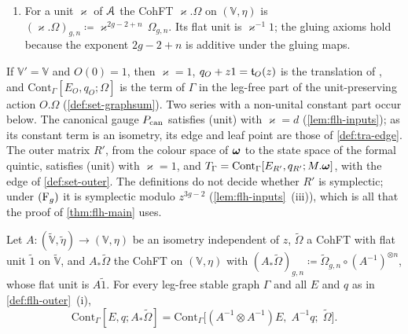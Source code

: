 \begin{defn}
\begin{enumerate}
\[
\text{(unit)}\qquad O_0^{-1}1'=\varkappa^{-1}1\quad\text{for a unit }\varkappa\text{ of }\cA .
\]
The edge and the leaf point of $O$ are
\[
E_O(\psi,\psi')\coloneqq\frac{\eta^{-1}-\bigl(O^{-1}(\psi)\otimes O^{-1}(\psi')\bigr)\eta'^{-1}}{\psi+\psi'},\qquad q_O(z)\coloneqq O^{-1}(z)(-z1'),
\]
where $\eta^{-1}\in\mathbb V\otimes\mathbb V$ and $\eta'^{-1}\in\mathbb V'\otimes\mathbb V'$ are the inverse bivectors. By symplecticity the numerator vanishes at $\psi'=-\psi$, so $E_O$ is a symmetric power series in $\psi,\psi'$ \cite[Rem.~2.1 and (6)]{PPZ15}; by (unit), $q_O\in-z\varkappa^{-1}1+z^2\mathbb V\fps{z}$.
\item For a unit $\varkappa$ of $\mathcal{A}$ the CohFT $\varkappa.\Omega$ on $(\mathbb V,\eta)$ is $(\varkappa.\Omega)_{g,n}\coloneqq\varkappa^{2g-2+n}\,\Omega_{g,n}$. Its flat unit is $\varkappa^{-1}1$; the gluing axioms hold because the exponent $2g-2+n$ is additive under the gluing maps.
\end{enumerate}
\end{defn}

If $\mathbb V'=\mathbb V$ and $O(0)=1$, then $\varkappa=1$, $q_O+z1=\mathfrak{t}_O(z)$ is the translation of \cite[Def.~2.13]{PPZ15}, and $\mathrm{Cont}_\Gamma[E_O,q_O;\Omega]$ is the term of $\Gamma$ in the leg-free part of the unit-preserving action $O.\Omega$ (\cref{def:set-graphsum}). Two series with a non-unital constant part occur below. The canonical gauge $P_{\mathrm{can}}$ satisfies (unit) with $\varkappa=d$ (\cref{lem:flh-inputs}); as its constant term is an isometry, its edge and leaf point are those of \cref{def:tra-edge}. The outer matrix $R'$, from the colour space of $\boldsymbol{\omega}$ to the state space of the formal quintic, satisfies (unit) with $\varkappa=1$, and $T_\Gamma=\mathrm{Cont}_\Gamma[E_{R'},q_{R'};M.\boldsymbol{\omega}]$, with the edge of \cref{def:set-outer}. The definitions do not decide whether $R'$ is symplectic; under $(\mathrm{F}_{g})$ it is symplectic modulo $z^{3g-2}$ (\cref{lem:flh-inputs}~(iii)), which is all that the proof of \cref{thm:flh-main} uses.

\begin{lem}
\label{lem:flh-frame}
Let $A\colon(\widetilde{\mathbb V},\tilde\eta)\to(\mathbb V,\eta)$ be an isometry independent of $z$, $\widetilde\Omega$ a CohFT with flat unit $\tilde 1$ on $\widetilde{\mathbb V}$, and $A_*\widetilde\Omega$ the CohFT on $(\mathbb V,\eta)$ with $(A_*\widetilde\Omega)_{g,n}\coloneqq\widetilde\Omega_{g,n}\circ(A^{-1})^{\otimes n}$, whose flat unit is $A\tilde1$. For every leg-free stable graph $\Gamma$ and all $E$ and $q$ as in \cref{def:flh-outer}~(i),
\[
\mathrm{Cont}_\Gamma[E,q;A_*\widetilde\Omega]=\mathrm{Cont}_\Gamma\bigl[(A^{-1}\otimes A^{-1})E,\;A^{-1}q;\;\widetilde\Omega\bigr].
\]
\end{lem}


